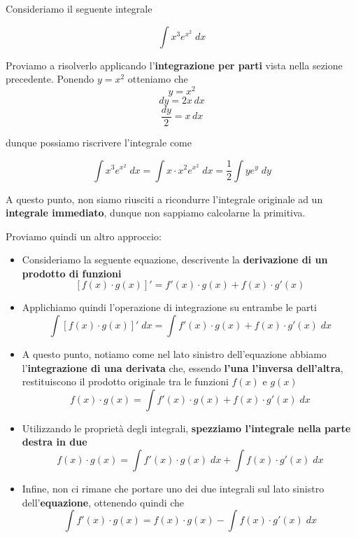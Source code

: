 \documentclass[a4paper, 12pt]{report}
\begin{document}
    Consideriamo il seguente integrale
    
    \[ \int x^3 e^{x^2} \; dx\]
    
    Proviamo a risolverlo applicando l'\textbf{integrazione per parti} vista nella sezione precedente. Ponendo $y = x^2$ otteniamo che
        \[ y = x^2\]
        \[ dy = 2x \, dx \]
        \[ \frac{dy}{2} = x \, dx \]
    
    dunque possiamo riscrivere l'integrale come
    
    \[ \int x^3 e^{x^2} \; dx = \int x \cdot x^2 e^{x^2} \; dx = \frac{1}{2} \int y e^{y} \; dy\]
    
    A questo punto, non siamo riusciti a ricondurre l'integrale originale ad un \textbf{integrale immediato}, dunque non sappiamo calcolarne la primitiva.
    
    Proviamo quindi un altro approccio:
    
    \begin{itemize}
        \item Consideriamo la seguente equazione, descrivente la \textbf{derivazione di un prodotto di funzioni}
        \[ [ f(x) \cdot g(x)]' = f'(x) \cdot g(x) + f(x) \cdot g'(x)\]
        
        \item Applichiamo quindi l'operazione di integrazione su entrambe le parti
        \[ \int [ f(x) \cdot g(x)]' \; dx = \int f'(x) \cdot g(x) + f(x) \cdot g'(x) \; dx\]
        
        \item A questo punto, notiamo come nel lato sinistro dell'equazione abbiamo l'\textbf{integrazione di una derivata} che, essendo \textbf{l'una l'inversa dell'altra}, restituiscono il prodotto originale tra le funzioni $f(x)$ e $g(x)$
        \[ f(x) \cdot g(x) = \int f'(x) \cdot g(x) + f(x) \cdot g'(x) \; dx\]
        
        \item Utilizzando le proprietà degli integrali, \textbf{spezziamo l'integrale nella parte destra in due}
        \[ f(x) \cdot g(x) = \int f'(x) \cdot g(x) \; dx + \int f(x) \cdot g'(x) \; dx\]
        
        \item Infine, non ci rimane che portare uno dei due integrali sul lato sinistro dell'\textbf{equazione}, ottenendo quindi che
        \[ \int f'(x) \cdot g(x) = f(x) \cdot g(x) - \int f(x) \cdot g'(x) \; dx\]
    \end{itemize}
    
\end{document}
